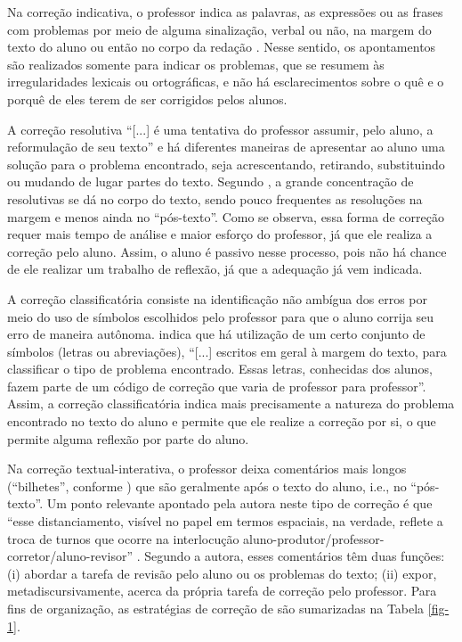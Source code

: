\documentclass[portuguese]{textolivre}
\begin{document}
Na correção indicativa, o professor indica as palavras, as expressões ou as frases com problemas por meio de alguma sinalização, verbal ou não, na margem do texto do aluno ou então no corpo da redação \textcite[p. 36]{ruiz2015}. Nesse sentido, os apontamentos são realizados somente para indicar os problemas, que se resumem às irregularidades lexicais ou ortográficas, e não há esclarecimentos sobre o quê e o porquê de eles terem de ser corrigidos pelos alunos.

A correção resolutiva ``[...] é uma tentativa do professor assumir, pelo aluno, a reformulação de seu texto'' \cite[p. 41]{ruiz2015} e há diferentes maneiras de apresentar ao aluno uma solução para o problema encontrado, seja acrescentando, retirando, substituindo ou mudando de lugar partes do texto. Segundo \textcite{ruiz2015}, a grande concentração de resolutivas se dá no corpo do texto, sendo pouco frequentes as resoluções na margem e menos ainda no ``pós-texto''. Como se observa, essa forma de correção requer mais tempo de análise e maior esforço do professor, já que ele realiza a correção pelo aluno. Assim, o aluno é passivo nesse processo, pois não há chance de ele realizar um trabalho de reflexão, já que a adequação já vem indicada.

A correção classificatória consiste na identificação não ambígua dos erros por meio do uso de símbolos escolhidos pelo professor para que o aluno corrija seu erro de maneira autônoma. \textcite[p. 45]{ruiz2015} indica que há utilização de um certo conjunto de símbolos (letras ou abreviações), ``[...] escritos em geral à margem do texto, para classificar o tipo de problema encontrado. Essas letras, conhecidas dos alunos, fazem parte de um código de correção que varia de professor para professor''. Assim, a correção classificatória indica mais precisamente a natureza do problema encontrado no texto do aluno e permite que ele realize a correção por si, o que permite alguma reflexão por parte do aluno.

Na correção textual-interativa, o professor deixa comentários mais longos (``bilhetes'', conforme \textcite[p. 47]{ruiz2015}) que são geralmente após o texto do aluno, i.e., no ``pós-texto''. Um ponto relevante apontado pela autora neste tipo de correção é que ``esse distanciamento, visível no papel em termos espaciais, na verdade, reflete a troca de turnos que ocorre na interlocução aluno-produtor/professor-corretor/aluno-revisor'' \cite[p. 48]{ruiz2015}. Segundo a autora, esses comentários têm duas funções: (i) abordar a tarefa de revisão pelo aluno ou os problemas do texto; (ii) expor, metadiscursivamente, acerca da própria tarefa de correção pelo professor. Para fins de organização, as estratégias de correção de \textcite{ruiz2015} são sumarizadas na Tabela \ref{fig-1}.
\end{document}
